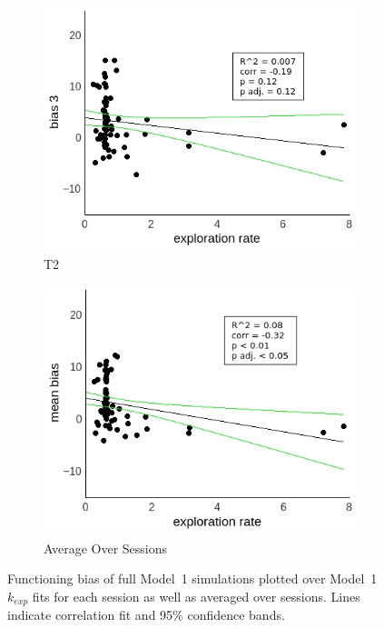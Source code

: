 \documentclass[a4paper]{scrreprt}
\begin{document}
\begin{figure}
\begin{subfigure}[b]{0.49\textwidth}
        \includegraphics[width=\textwidth]{figs/sec3/temp/temp_diff_3_mod1mod1.jpeg}
        \caption{T2}
    \end{subfigure}
    \begin{subfigure}[b]{0.49\textwidth}
        \includegraphics[width=\textwidth]{figs/sec3/temp/temp_diff_mean_mod1mod1.jpeg}
        \caption{Average Over Sessions}
    \end{subfigure}
\caption{Functioning bias of full Model~1 simulations plotted over Model~1 $k_{exp}$ fits for each session as well as averaged over sessions. Lines indicate correlation fit and 95\% confidence bands.}
\label{fig:temp_diff_mod1mod1}
\end{figure}
\end{document}
